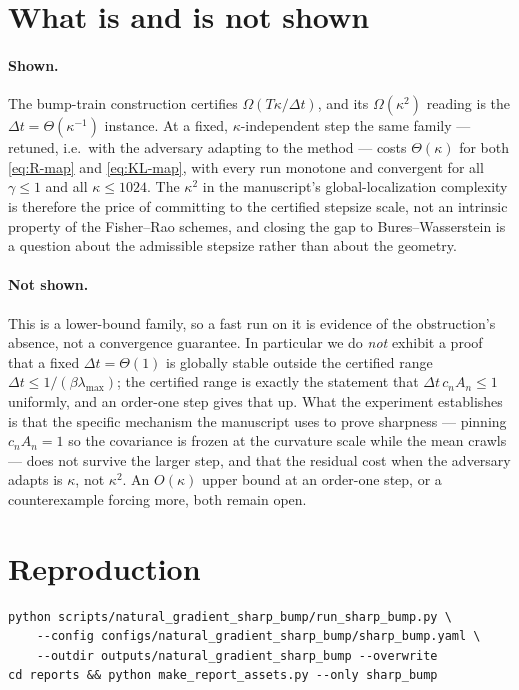 \documentclass[11pt]{article}
\begin{document}
\section{What is and is not shown}
\label{sec:scope}

\paragraph{Shown.} The bump-train construction certifies
$\Omega(T\kappa/\Delta t)$, and its $\Omega(\kappa^2)$ reading is the
$\Delta t=\Theta(\kappa^{-1})$ instance. At a fixed, $\kappa$-independent step the
same family --- retuned, i.e.\ with the adversary adapting to the method --- costs
$\Theta(\kappa)$ for both \eqref{eq:R-map} and \eqref{eq:KL-map}, with every run
monotone and convergent for all $\gamma\le1$ and all $\kappa\le1024$. The
$\kappa^2$ in the manuscript's global-localization complexity is therefore the price
of committing to the certified stepsize scale, not an intrinsic property of the
Fisher--Rao schemes, and closing the gap to Bures--Wasserstein is a question about
the admissible stepsize rather than about the geometry.

\paragraph{Not shown.} This is a lower-bound family, so a fast run on it is evidence
of the obstruction's absence, not a convergence guarantee. In particular we do
\emph{not} exhibit a proof that a fixed $\Delta t=\Theta(1)$ is globally stable
outside the certified range $\Delta t\le1/(\beta\lambda_{\max})$; the certified range
is exactly the statement that $\Delta t\,c_nA_n\le1$ uniformly, and an order-one step
gives that up. What the experiment establishes is that the specific mechanism the
manuscript uses to prove sharpness --- pinning $c_nA_n=1$ so the covariance is frozen
at the curvature scale while the mean crawls --- does not survive the larger step,
and that the residual cost when the adversary adapts is $\kappa$, not $\kappa^2$. An
$O(\kappa)$ upper bound at an order-one step, or a counterexample forcing more, both
remain open.

\section{Reproduction}
\label{sec:repro}

\begin{verbatim}
python scripts/natural_gradient_sharp_bump/run_sharp_bump.py \
    --config configs/natural_gradient_sharp_bump/sharp_bump.yaml \
    --outdir outputs/natural_gradient_sharp_bump --overwrite
cd reports && python make_report_assets.py --only sharp_bump
\end{verbatim}
\end{document}
